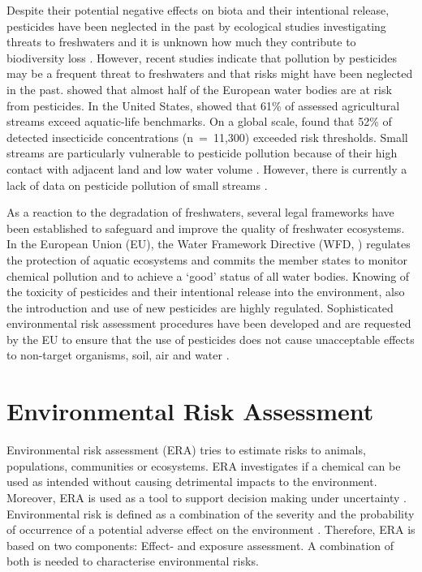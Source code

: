 Despite their potential negative effects on biota and their intentional release, pesticides have been neglected in the past by ecological studies investigating threats to freshwaters \citep{schafer_contribution_2016} and it is unknown how much they contribute to biodiversity loss \citep{rockstrom_safe_2009, persson_confronting_2013}. 
However, recent studies indicate that pollution by pesticides may be a frequent threat to freshwaters and that risks might have been neglected in the past.
\citet{malaj_organic_2014} showed that almost half of the European water bodies are at risk from pesticides. 
In the United States, \citet{stone_pesticides_2014} showed that 61\% of assessed agricultural streams exceed aquatic-life benchmarks.
On a global scale, \citet{stehle_pesticide_2015} found that 52\% of detected insecticide concentrations (n~=~11,300) exceeded risk thresholds.
Small streams are particularly vulnerable to pesticide pollution because of their high contact with adjacent land and low water volume \citep{biggs_importance_2016}.
However, there is currently a lack of data on pesticide pollution of small streams \citep{lorenz_specifics_2016}. 

As a reaction to the degradation of freshwaters, several legal frameworks have been established to safeguard and improve the quality of freshwater ecosystems. 
In the European Union (EU), the Water Framework Directive (WFD, \citet{european_union_directive_2000}) regulates the protection of aquatic ecosystems and commits the member states to monitor chemical pollution and to achieve a `good' status of all water bodies. 
Knowing of the toxicity of pesticides and their intentional release into the environment, also the introduction and use of new pesticides are highly regulated.
Sophisticated environmental risk assessment procedures have been developed and are requested by the EU to ensure that the use of pesticides does not cause unacceptable effects to non-target organisms, soil, air and water \citep{european_union_regulation_2009}. 



\section{Environmental Risk Assessment}

Environmental risk assessment (ERA) tries to estimate risks to animals, populations, communities or ecosystems.
ERA investigates if a chemical can be used as intended without causing detrimental impacts to the environment. 
Moreover, ERA is used as a tool to support decision making under uncertainty \citep{newman_fundamentals_2015}. 
Environmental risk is defined as a combination of the severity and the probability of occurrence of a potential adverse effect on the environment \citep{suter_ecological_2007}. 
Therefore, ERA is based on two components: Effect- and exposure assessment.
A combination of both is needed to characterise environmental risks.

